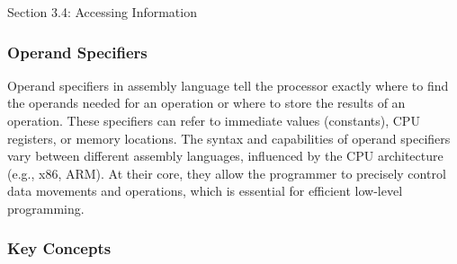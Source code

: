 \begin{notes}{Section 3.4: Accessing Information}
    \subsubsection*{Operand Specifiers}

    Operand specifiers in assembly language tell the processor exactly where to find the operands needed for an operation or where to store the results of an operation. These specifiers can refer to 
    immediate values (constants), CPU registers, or memory locations. The syntax and capabilities of operand specifiers vary between different assembly languages, influenced by the CPU architecture 
    (e.g., x86, ARM). At their core, they allow the programmer to precisely control data movements and operations, which is essential for efficient low-level programming. \vspace*{1em}

    \subsubsection*{Key Concepts}


\end{notes}
